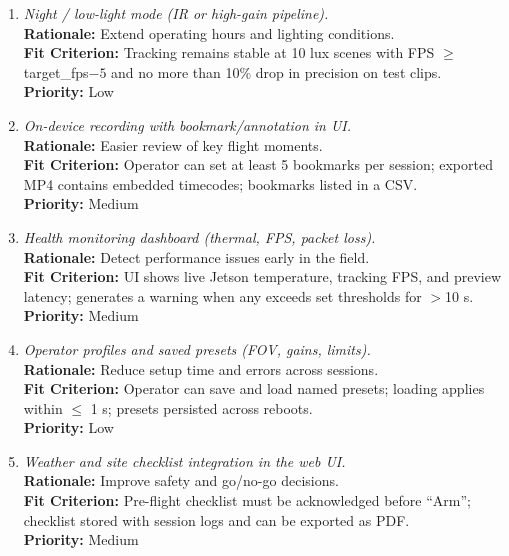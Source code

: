 \documentclass[12pt]{article}
\begin{document}
\begin{enumerate}[label=WTRM \arabic*., wide=0pt, leftmargin=*]
  \item \emph{Night / low-light mode (IR or high-gain pipeline).}\\[2mm]
  \textbf{Rationale:} Extend operating hours and lighting conditions.\\
  \textbf{Fit Criterion:} Tracking remains stable at 10 lux scenes with FPS $\geq$ target\_fps$-5$ and no more than 10\% drop in precision on test clips.\\
  \textbf{Priority:} Low

  \item \emph{On-device recording with bookmark/annotation in UI.}\\[2mm]
  \textbf{Rationale:} Easier review of key flight moments.\\
  \textbf{Fit Criterion:} Operator can set at least 5 bookmarks per session; exported MP4 contains embedded timecodes; bookmarks listed in a CSV.\\
  \textbf{Priority:} Medium

  \item \emph{Health monitoring dashboard (thermal, FPS, packet loss).}\\[2mm]
  \textbf{Rationale:} Detect performance issues early in the field.\\
  \textbf{Fit Criterion:} UI shows live Jetson temperature, tracking FPS, and preview latency; generates a warning when any exceeds set thresholds for $>$10 s.\\
  \textbf{Priority:} Medium

  \item \emph{Operator profiles and saved presets (FOV, gains, limits).}\\[2mm]
  \textbf{Rationale:} Reduce setup time and errors across sessions.\\
  \textbf{Fit Criterion:} Operator can save and load named presets; loading applies within $\leq$ 1 s; presets persisted across reboots.\\
  \textbf{Priority:} Low

  \item \emph{Weather and site checklist integration in the web UI.}\\[2mm]
  \textbf{Rationale:} Improve safety and go/no-go decisions.\\
  \textbf{Fit Criterion:} Pre-flight checklist must be acknowledged before “Arm”; checklist stored with session logs and can be exported as PDF.\\
  \textbf{Priority:} Medium


\end{enumerate}
\end{document}
